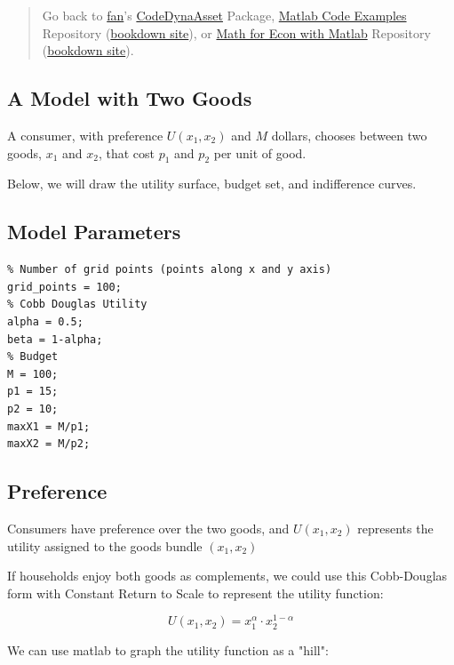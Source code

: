 \documentclass[
]{book}
\begin{document}
\begin{quote}
Go back to \href{http://fanwangecon.github.io/}{fan}'s \href{https://fanwangecon.github.io/CodeDynaAsset/}{CodeDynaAsset} Package, \href{https://fanwangecon.github.io/M4Econ/}{Matlab Code Examples} Repository (\href{https://fanwangecon.github.io/M4Econ/bookdown}{bookdown site}), or \href{https://fanwangecon.github.io/Math4Econ/}{Math for Econ with Matlab} Repository (\href{https://fanwangecon.github.io/Math4Econ/bookdown}{bookdown site}).
\end{quote}

\hypertarget{a-model-with-two-goods}{%
\subsection{A Model with Two Goods}\label{a-model-with-two-goods}}

A consumer, with preference \(U(x_1 ,x_2 )\) and \(M\) dollars, chooses
between two goods, \(x_1\) and \(x_2\), that cost \(p_1\) and \(p_2\) per unit
of good.

Below, we will draw the utility surface, budget set, and indifference
curves.

\hypertarget{model-parameters}{%
\subsection{Model Parameters}\label{model-parameters}}

\begin{verbatim}
% Number of grid points (points along x and y axis)
grid_points = 100;
% Cobb Douglas Utility
alpha = 0.5;
beta = 1-alpha;
% Budget
M = 100;
p1 = 15;
p2 = 10;
maxX1 = M/p1;
maxX2 = M/p2;
\end{verbatim}

\hypertarget{preference}{%
\subsection{Preference}\label{preference}}

Consumers have preference over the two goods, and \(U(x_1 ,x_2 )\)
represents the utility assigned to the goods bundle \((x_1 ,x_2 )\)

If households enjoy both goods as complements, we could use this
Cobb-Douglas form with Constant Return to Scale to represent the utility
function:

\[U(x_1 ,x_2 )=x_1^{\alpha } \cdot x_2^{1-\alpha }\]

We can use matlab to graph the utility function as a "hill":
\end{document}
